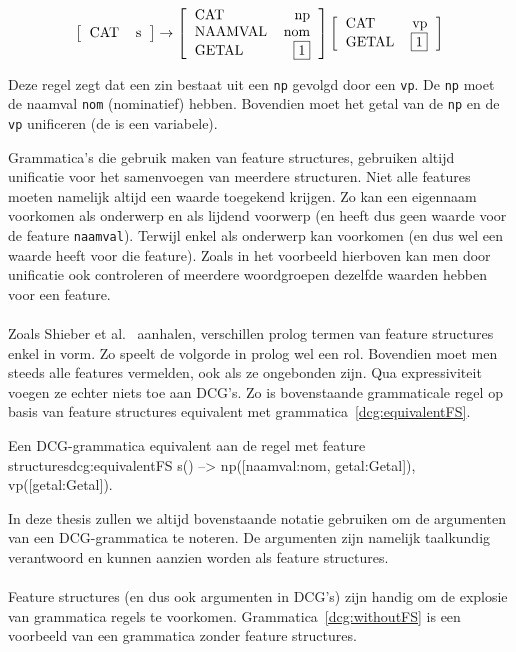 \[
  \fstructure{
    \feature{CAT}{s}
  }
  \rightarrow
  \fstructure{
    \feature{CAT}{np}
    \feature{NAAMVAL}{nom}
    \feature{GETAL}{\fvariable{1}}
  }
  \fstructure{
    \feature{CAT}{vp}
    \feature{GETAL}{\fvariable{1}}
  }
\]

Deze regel zegt dat een zin bestaat uit een \texttt{np} gevolgd door een \texttt{vp}. De \texttt{np} moet de naamval \texttt{nom} (nominatief) hebben. Bovendien moet het getal van de \texttt{np} en de \texttt{vp} unificeren (de  is een variabele).

Grammatica's die gebruik maken van feature structures, gebruiken altijd unificatie voor het samenvoegen van meerdere structuren. Niet alle features moeten namelijk altijd een waarde toegekend krijgen. Zo kan een eigennaam voorkomen als onderwerp en als lijdend voorwerp (en heeft dus geen waarde voor de feature \texttt{naamval}). Terwijl  enkel als onderwerp kan voorkomen (en dus wel een waarde heeft voor die feature). Zoals in het voorbeeld hierboven kan men door unificatie ook controleren of meerdere woordgroepen dezelfde waarden hebben voor een feature.

\paragraph{} Zoals Shieber et al.\ \cite{Shieber2003} aanhalen, verschillen prolog termen van feature structures enkel in vorm. Zo speelt de volgorde in prolog wel een rol. Bovendien moet men steeds alle features vermelden, ook als ze ongebonden zijn. Qua expressiviteit voegen ze echter niets toe aan DCG's. Zo is bovenstaande grammaticale regel op basis van feature structures equivalent met grammatica~\ref{dcg:equivalentFS}.

\begin{dcg}{Een DCG-grammatica equivalent aan de regel met feature structures}{dcg:equivalentFS}
s() --> np([naamval:nom, getal:Getal]), vp([getal:Getal]).
\end{dcg}

In deze thesis zullen we altijd bovenstaande notatie gebruiken om de argumenten van een DCG-grammatica te noteren. De argumenten zijn namelijk taalkundig verantwoord en kunnen aanzien worden als feature structures.

\paragraph{} Feature structures (en dus ook argumenten in DCG's) zijn handig om de explosie van grammatica regels te voorkomen. Grammatica~\ref{dcg:withoutFS} is een voorbeeld van een grammatica zonder feature structures.

